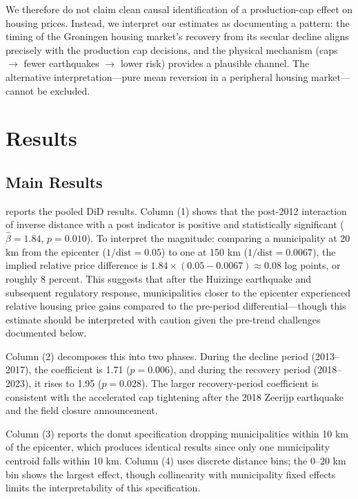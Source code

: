 \documentclass[12pt]{article}
\begin{document}
We therefore do not claim clean causal identification of a production-cap effect on housing prices. Instead, we interpret our estimates as documenting a pattern: the timing of the Groningen housing market's recovery from its secular decline aligns precisely with the production cap decisions, and the physical mechanism (caps $\rightarrow$ fewer earthquakes $\rightarrow$ lower risk) provides a plausible channel. The alternative interpretation---pure mean reversion in a peripheral housing market---cannot be excluded.

\section{Results}\label{sec:results}

\subsection{Main Results}

 reports the pooled DiD results. Column (1) shows that the post-2012 interaction of inverse distance with a post indicator is positive and statistically significant ($\hat{\beta} = 1.84$, $p = 0.010$). To interpret the magnitude: comparing a municipality at 20 km from the epicenter ($1/\text{dist} = 0.05$) to one at 150 km ($1/\text{dist} = 0.0067$), the implied relative price difference is $1.84 \times (0.05 - 0.0067) \approx 0.08$ log points, or roughly 8 percent. This suggests that after the Huizinge earthquake and subsequent regulatory response, municipalities closer to the epicenter experienced relative housing price gains compared to the pre-period differential---though this estimate should be interpreted with caution given the pre-trend challenges documented below.

Column (2) decomposes this into two phases. During the decline period (2013--2017), the coefficient is 1.71 ($p = 0.006$), and during the recovery period (2018--2023), it rises to 1.95 ($p = 0.028$). The larger recovery-period coefficient is consistent with the accelerated cap tightening after the 2018 Zeerijp earthquake and the field closure announcement.

Column (3) reports the donut specification dropping municipalities within 10 km of the epicenter, which produces identical results since only one municipality centroid falls within 10 km. Column (4) uses discrete distance bins; the 0--20 km bin shows the largest effect, though collinearity with municipality fixed effects limits the interpretability of this specification.
\end{document}
